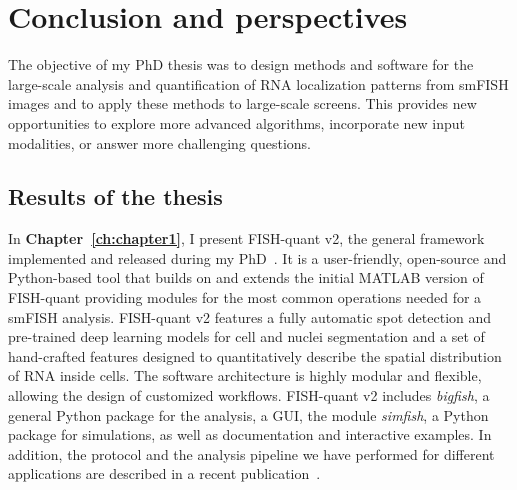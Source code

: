 
\chapter{Conclusion and perspectives}
\label{ch:conclusion}

\minitoc
\newpage

The objective of my PhD thesis was to design methods and software for the large-scale analysis and quantification of \ac{RNA} localization patterns from \ac{smFISH} images and to apply these methods to large-scale screens. 
This provides new opportunities to explore more advanced algorithms, incorporate new input modalities, or answer more challenging questions.

\section{Results of the thesis}
\label{sec:conclusion_thesis}

In \textbf{Chapter~\ref{ch:chapter1}}, I present FISH-quant v2, the general framework implemented and released during my PhD~\cite{Imbert_fq_2022}.
It is a user-friendly, open-source and Python-based tool that builds on and extends the initial MATLAB version of FISH-quant providing modules for the most common operations needed for a \ac{smFISH} analysis. 
FISH-quant v2 features a fully automatic spot detection and pre-trained deep learning models for cell and nuclei segmentation and a set of hand-crafted features designed to quantitatively describe the spatial distribution of \ac{RNA} inside cells. 
The software architecture is highly modular and flexible, allowing the design of customized workflows. 
FISH-quant v2 includes \emph{bigfish}, a general Python package for the analysis, a \ac{GUI}, the module \emph{simfish}, a Python package for simulations, as well as documentation and interactive examples.
In addition, the protocol and the analysis pipeline we have performed for different applications are described in a recent publication~\cite{safieddine_ht_smfish_2022}.

